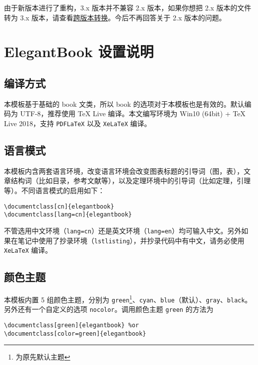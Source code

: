 \documentclass[cn,11pt,fancy]{elegantbook}
\begin{document}
\begin{note}
由于新版本进行了重构，3.x 版本并不兼容 2.x 版本，如果你想把 2.x 版本的文件转为 3.x 版本，请查看\href{https://github.com/ElegantLaTeX/ElegantBook/wiki/convert}{跨版本转换}。今后不再回答关于 2.x 版本的问题。
\end{note}

\chapter{ElegantBook 设置说明}

\section{编译方式}

本模板基于基础的 book 文类，所以 book 的选项对于本模板也是有效的。默认编码为 UTF-8，推荐使用 \TeX{} Live 编译。本文编写环境为 Win10 (64bit) + \TeX{} Live 2018，支持 \lstinline{PDFLaTeX} 以及 \lstinline{XeLaTeX} 编译。


\section{语言模式}
本模板内含两套语言环境，改变语言环境会改变图表标题的引导词（图，表），文章结构词（比如目录，参考文献等），以及定理环境中的引导词（比如定理，引理等）。不同语言模式的启用如下：
\begin{lstlisting}
\documentclass[cn]{elegantbook} 
\documentclass[lang=cn]{elegantbook}
\end{lstlisting}

\begin{remark}
不管选用中文环境（\lstinline{lang=cn}）还是英文环境（\lstinline{lang=en}）均可输入中文。另外如果在笔记中使用了抄录环境（\lstinline{lstlisting}），并抄录代码中有中文，请务必使用 \lstinline{XeLaTeX} 编译。
\end{remark}



\section{颜色主题}
本模板内置 5 组颜色主题，分别为 \textcolor{main1}{\lstinline{green}}\footnote{为原先默认主题}、\textcolor{main2}{\lstinline{cyan}}、\textcolor{main3}{\lstinline{blue}}（默认）、\textcolor{main4}{\lstinline{gray}}、\textcolor{main5}{\lstinline{black}}。另外还有一个自定义的选项  \lstinline{nocolor}。调用颜色主题 \lstinline{green} 的方法为 
\begin{lstlisting}
\documentclass[green]{elegantbook} %or
\documentclass[color=green]{elegantbook}
\end{lstlisting}
\end{document}
